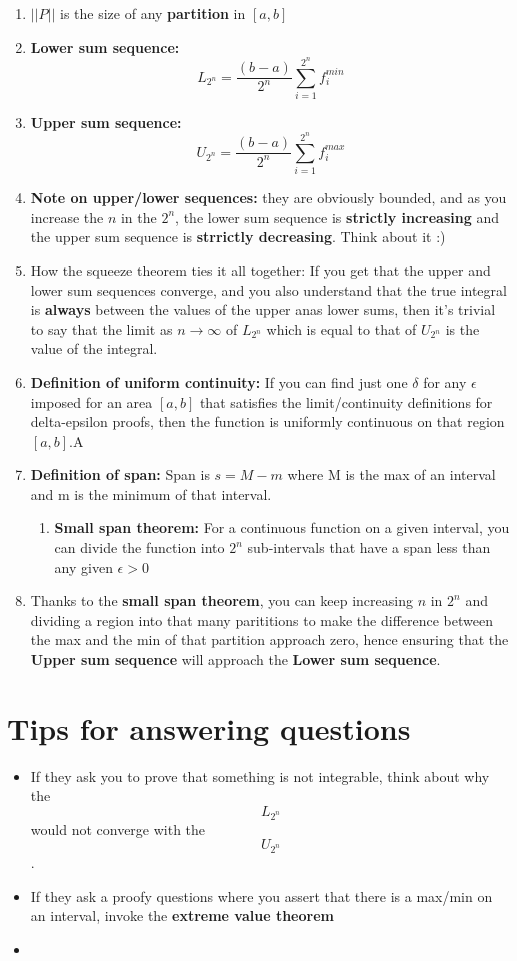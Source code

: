 \documentclass[a4paper,12pt]{report}
\begin{document}
\begin{enumerate}
\item $||P||$ is the size of any \textbf{partition} in $[a, b]$
\item \textbf{Lower sum sequence: } $$L_{2^n} = \frac{(b-a)}{2^n} \sum_{i=1}^{2^n} f_i^{min}$$
\item \textbf{Upper sum sequence: } $$U_{2^n} = \frac{(b-a)}{2^n} \sum_{i=1}^{2^n} f_i^{max}$$
\item \textbf{Note on upper/lower sequences: } they are obviously bounded, and as you increase the $n$ in the $2^n$, the lower sum sequence is \textbf{strictly increasing} and the upper sum sequence is \textbf{strrictly decreasing}. Think about it :)
\item How the squeeze theorem ties it all together: If you get that the upper and lower sum sequences converge, and you also understand that the true integral is \textbf{always} between the values of the upper anas lower sums, then it's trivial to say that the limit as $n\to \infty$ of $L_{2^n}$ which is equal to that of $U_{2^n}$ is the value of the integral.
\item \textbf{Definition of uniform continuity:} If you can find just one $\delta$ for any $\epsilon$ imposed for an area $[a, b]$ that satisfies the limit/continuity definitions for delta-epsilon proofs, then the function is uniformly continuous on that region $[a, b]$.A
\item \textbf{Definition of span:} Span is $s = M-m$ where M is the max of an interval and m is the minimum of that interval.
\begin{enumerate}
\item \textbf{Small span theorem:} For a continuous function on a given interval, you can divide the function into $2^n$ sub-intervals that have a span less than any given $\epsilon > 0$
\end{enumerate}
\item Thanks to the \textbf{small span theorem}, you can keep increasing $n$ in $2^n$ and dividing a region into that many parititions to make the difference between the max and the min of that partition approach zero, hence ensuring that the \textbf{Upper sum sequence} will approach the \textbf{Lower sum sequence}. 
\end{enumerate}

\section{Tips for answering questions}
\begin{itemize}
\item If they ask you to prove that something is not integrable, think about why the $$L_{2^n}$$ would not converge with the $$U_{2^n}$$.
\item If they ask a proofy questions where you assert that there is a max/min on an interval, invoke the \textbf{extreme value theorem}
\item 
\end{itemize}
\end{document}
